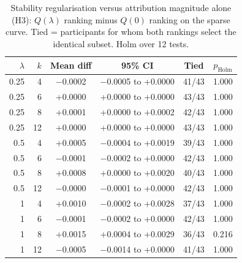 \begin{table}[t]
\centering
\small
\caption{Stability regularisation versus attribution magnitude alone (H3): $Q(\lambda)$ ranking minus $Q(0)$ ranking on the sparse curve. Tied = participants for whom both rankings select the identical subset. Holm over 12 tests.}
\label{tab:lambda}
\begin{tabular}{rrcccc}
\toprule
$\lambda$ & $k$ & Mean diff & 95\% CI & Tied & $p_{\mathrm{Holm}}$ \\
\midrule
0.25 & 4 & $-$0.0002 & $-$0.0005 to +0.0000 & 41/43 & 1.000 \\
0.25 & 6 & +0.0000 & +0.0000 to +0.0000 & 43/43 & 1.000 \\
0.25 & 8 & +0.0001 & +0.0000 to +0.0002 & 42/43 & 1.000 \\
0.25 & 12 & +0.0000 & +0.0000 to +0.0000 & 43/43 & 1.000 \\
0.5 & 4 & +0.0005 & $-$0.0004 to +0.0019 & 39/43 & 1.000 \\
0.5 & 6 & $-$0.0001 & $-$0.0002 to +0.0000 & 42/43 & 1.000 \\
0.5 & 8 & +0.0008 & +0.0000 to +0.0020 & 40/43 & 1.000 \\
0.5 & 12 & $-$0.0000 & $-$0.0001 to +0.0000 & 42/43 & 1.000 \\
1 & 4 & +0.0010 & $-$0.0002 to +0.0028 & 37/43 & 1.000 \\
1 & 6 & $-$0.0001 & $-$0.0002 to +0.0000 & 42/43 & 1.000 \\
1 & 8 & +0.0015 & +0.0004 to +0.0029 & 36/43 & 0.216 \\
1 & 12 & $-$0.0005 & $-$0.0014 to +0.0000 & 41/43 & 1.000 \\
\bottomrule
\end{tabular}
\end{table}
